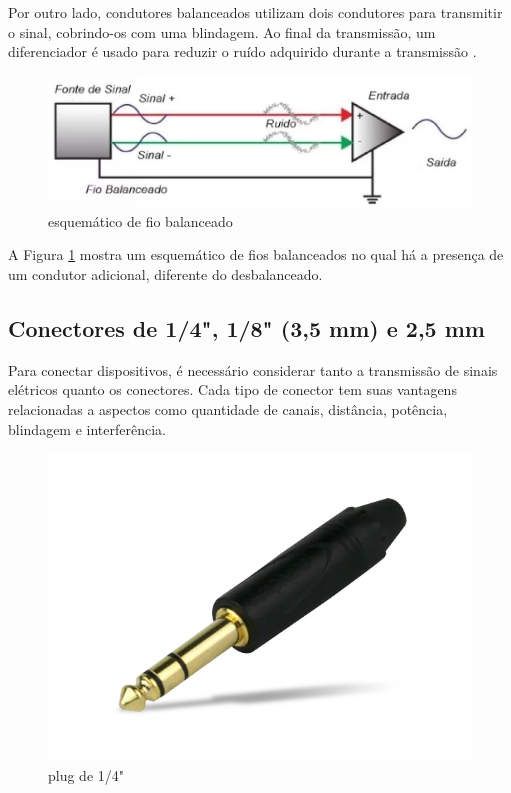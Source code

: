 Por outro lado, condutores balanceados utilizam dois condutores para transmitir o sinal, cobrindo-os com uma blindagem. Ao final da transmissão, um diferenciador é usado para reduzir o ruído adquirido durante a transmissão \cite{bartlett}.

\begin{figure}[h]
	\centering
    \includegraphics[scale=0.4]{figuras/fig12.eps}
	\caption{esquemático de fio balanceado \cite{proaudiospQualDiferena}}
	\label{fig11}
\end{figure}

A Figura \ref{fig11} mostra um esquemático de fios balanceados no qual há a presença de um condutor adicional, diferente do desbalanceado. 

\subsection{Conectores de 1/4", 1/8" (3,5 mm) e 2,5 mm}

Para conectar dispositivos, é necessário considerar tanto a transmissão de sinais elétricos quanto os conectores. Cada tipo de conector tem suas vantagens relacionadas a aspectos como quantidade de canais, distância, potência, blindagem e interferência.

\begin{figure}[h]
	\centering
    \includegraphics[scale=0.2]{figuras/fig19.png}
	\caption{plug de 1/4" \cite{mouser}}
	\label{fig19}
\end{figure}

